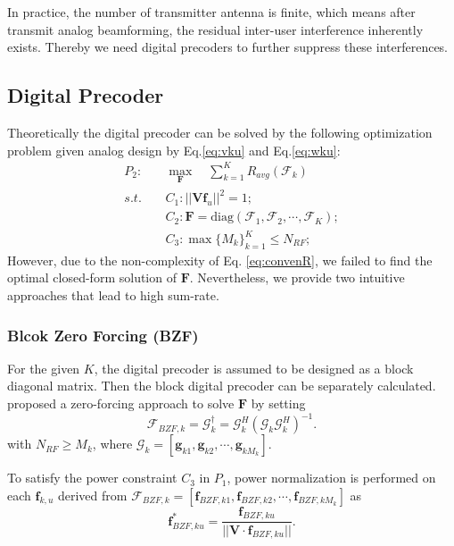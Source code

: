 \documentclass[conference]{IEEEtran}
\begin{document}
{In practice, the number of transmitter antenna is finite, which means after transmit analog beamforming, the residual inter-user interference inherently exists. Thereby we need digital precoders to further suppress these interferences.

\subsection{Digital Precoder}


Theoretically the digital precoder can be solved by the following optimization problem given analog design by Eq.\eqref{eq:vku} and Eq.\eqref{eq:wku}:
\begin{align}\label{eq:digital}
P_2: \quad&\max_{\bm F}\quad \sum_{k=1}^{K} R_{avg}(\bm{\mathcal{F}}_k)\\ \nonumber
s.t. \quad &C_1: ||\bm{Vf}_u||^2=1;\nonumber\\
&C_2: \bm{F} = \text{diag}(\bm{\mathcal{F}}_1, \bm{\mathcal{F}}_2, \cdots, \bm{\mathcal{F}}_{K});\nonumber\\
&C_3: \max \{M_k\}_{k=1}^K \leq N_{RF};\nonumber
\end{align}
However, due to the non-complexity of Eq. \eqref{eq:convenR}, we failed to find the optimal closed-form solution of $\bm F$. Nevertheless, we provide two intuitive approaches that lead to high sum-rate.

\subsubsection{Blcok Zero Forcing (BZF)}
For the given $K$, the digital precoder is assumed to be designed as a block diagonal matrix. Then the block digital precoder can be separately calculated. \cite{alkhateeb2014channel} proposed a zero-forcing approach to solve $\bm{F}$ by setting
\begin{equation}
\bm{\mathcal{F}}_{BZF,k} = \bm{\mathcal{G}}_k^\dagger = \bm{\mathcal{G}}_k^H (\bm{\mathcal{G}}_k \bm{\mathcal{G}}_k^H)^{-1}.
\end{equation}
with $N_{RF}\geq M_k$, where $\bm{\mathcal{G}}_k = [\bm{g}_{k1}, \bm{g}_{k2},\cdots,\bm{g}_{kM_k}]$.

To satisfy the power constraint $C_3$ in $P_1$, power normalization is performed on each ${\bm f}_{k,u}$ derived from $\bm{\mathcal{F}}_{BZF,k}=\left[\bm{f}_{BZF,k1},\bm{f}_{BZF,k2},\cdots,\bm{f}_{BZF,kM_k}\right]$ as
\begin{equation}\label{eq:ZFU-HBF2}
\bm{f}^*_{BZF,ku} = {\frac{\bm{f}_{BZF,ku}}{||\bm{V}\cdot\bm{f}_{BZF,ku}||}}.
\end{equation}

}
\end{document}
